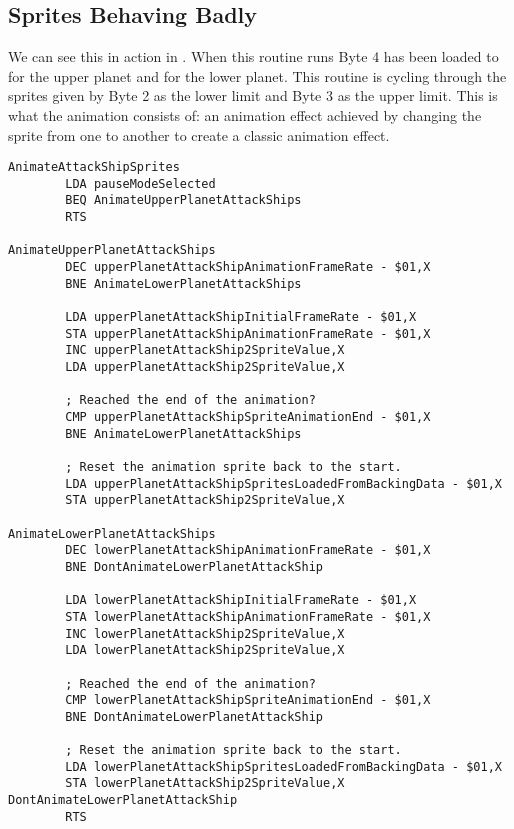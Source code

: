 \subsection{Sprites Behaving Badly}

We can see this in action in . When this routine runs Byte 4 has been loaded
to  for the upper planet and 
for the lower planet. This routine is cycling through the sprites given by Byte 2 as the lower limit and Byte 3 as 
the upper limit. This is what the animation consists of: an animation effect achieved by changing the sprite from
one to another to create a classic animation effect.

\begin{lstlisting}[caption=Routine for Animating Enemy Sprites. ]
AnimateAttackShipSprites
        LDA pauseModeSelected
        BEQ AnimateUpperPlanetAttackShips
        RTS

AnimateUpperPlanetAttackShips   
        DEC upperPlanetAttackShipAnimationFrameRate - $01,X
        BNE AnimateLowerPlanetAttackShips

        LDA upperPlanetAttackShipInitialFrameRate - $01,X
        STA upperPlanetAttackShipAnimationFrameRate - $01,X
        INC upperPlanetAttackShip2SpriteValue,X
        LDA upperPlanetAttackShip2SpriteValue,X

        ; Reached the end of the animation?
        CMP upperPlanetAttackShipSpriteAnimationEnd - $01,X
        BNE AnimateLowerPlanetAttackShips

        ; Reset the animation sprite back to the start.
        LDA upperPlanetAttackShipSpritesLoadedFromBackingData - $01,X
        STA upperPlanetAttackShip2SpriteValue,X

AnimateLowerPlanetAttackShips   
        DEC lowerPlanetAttackShipAnimationFrameRate - $01,X
        BNE DontAnimateLowerPlanetAttackShip

        LDA lowerPlanetAttackShipInitialFrameRate - $01,X
        STA lowerPlanetAttackShipAnimationFrameRate - $01,X
        INC lowerPlanetAttackShip2SpriteValue,X
        LDA lowerPlanetAttackShip2SpriteValue,X

        ; Reached the end of the animation?
        CMP lowerPlanetAttackShipSpriteAnimationEnd - $01,X
        BNE DontAnimateLowerPlanetAttackShip

        ; Reset the animation sprite back to the start.
        LDA lowerPlanetAttackShipSpritesLoadedFromBackingData - $01,X
        STA lowerPlanetAttackShip2SpriteValue,X
DontAnimateLowerPlanetAttackShip   
        RTS
\end{lstlisting}
 

